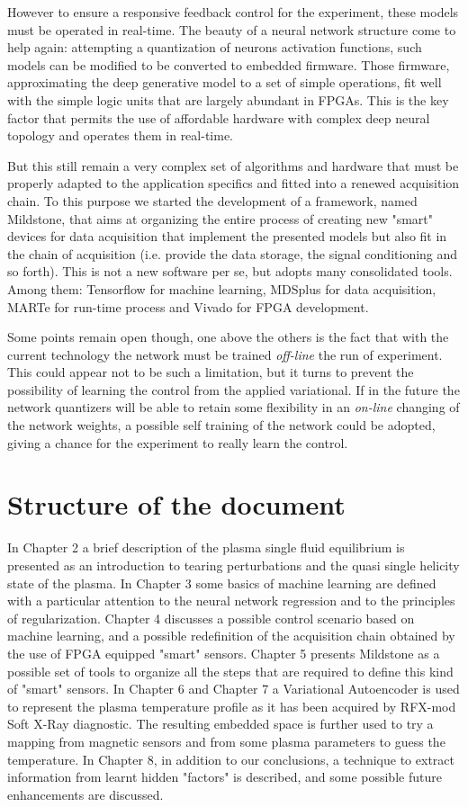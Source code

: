 However to ensure a responsive feedback control for the experiment, these models must be operated in real-time.
The beauty of a neural network structure come to help again: attempting a quantization of neurons activation functions, such models can be modified to be converted to embedded firmware. Those firmware, approximating the deep generative model to a set of simple operations, fit well with the simple logic units that are largely abundant in FPGAs. This is the key factor that permits the use of affordable hardware with complex deep neural topology and operates them in real-time. 

But this still remain a very complex set of algorithms and hardware that must be properly adapted to the application specifics and fitted into a renewed acquisition chain.
To this purpose we started the development of a framework, named Mildstone, that aims at organizing the entire process of creating new "smart" devices for data acquisition that implement the presented models but also fit in the chain of acquisition (i.e. provide the data storage, the signal conditioning and so forth).
This is not a new software per se, but adopts many consolidated tools. Among them: Tensorflow for machine learning, MDSplus for data acquisition, MARTe for run-time process and Vivado for FPGA development.

Some points remain open though, one above the others is the fact that with the current technology the network must be trained \textit{off-line} the run of experiment. This could appear not to be such a limitation, but it turns to prevent the possibility of learning the control from the applied variational. If in the future the network quantizers will be able to retain some flexibility in an \textit{on-line} changing of the network weights, a possible self training of the network could be adopted, giving a chance for the experiment to really learn the control.


\section{Structure of the document}
In Chapter 2 a brief description of the plasma single fluid equilibrium is presented as an introduction to tearing perturbations and the quasi single helicity state of the plasma. 
In Chapter 3 some basics of machine learning are defined with a particular attention to the neural network regression and to the principles of regularization. 
Chapter 4 discusses a possible control scenario based on machine learning, and a possible redefinition of the acquisition chain obtained by the use of FPGA equipped "smart" sensors.
Chapter 5 presents Mildstone as a possible set of tools to organize all the steps that are required to define this kind of "smart" sensors.
In Chapter 6 and Chapter 7 a Variational Autoencoder is used to represent the plasma temperature profile as it has been acquired by RFX-mod Soft X-Ray diagnostic. The resulting embedded space is further used to try a mapping from magnetic sensors and from some plasma parameters to guess the temperature.
In Chapter 8, in addition to our conclusions, a technique to extract information from learnt hidden "factors" is described, and some possible future enhancements are discussed.